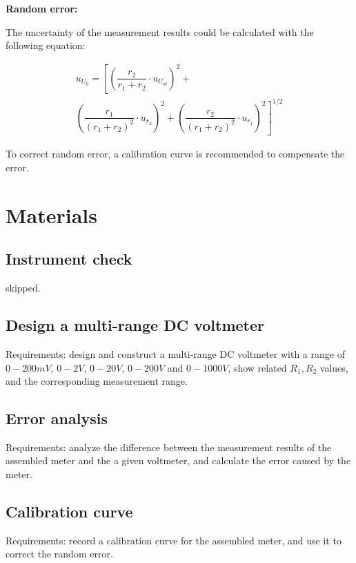 \documentclass[a4paper]{article}
\begin{document}
\begin{multicols*}{2}
    \textbf{Random error:}

    The uncertainty of the measurement results could be calculated with the following equation:

    \begin{equation}
        \begin{split}
            u_{U_0} = \left[\left(\dfrac{r_2}{r_1 + r_2} \cdot u_{U_{i0}}\right)^2 + \right.\\\left.\left(\dfrac{r_1}{(r_1 + r_2)^2} \cdot u_{r_{2}}\right)^2 + \left(\dfrac{r_2}{(r_1 + r_2)^2} \cdot u_{r_{1}}\right)^2 \right]^{1/2}
        \end{split}
    \end{equation}

    To correct random error, a calibration curve is recommended to compensate the error.

    \section*{Materials}

    \subsection*{Instrument check}

    skipped.

    \subsection*{Design a multi-range DC voltmeter}

    Requirements: design and construct a multi-range DC voltmeter with a range of $0-200mV$, $0-2V$, $0-20V$, $0-200V$ and $0-1000V$, show related $R_1, R_2$ values, and the corresponding measurement range.

    \subsection*{Error analysis}

    Requirements: analyze the difference between the measurement results of the assembled meter and the a given voltmeter, and calculate the error caused by the meter.

    \subsection*{Calibration curve}

    Requirements: record a calibration curve for the assembled meter, and use it to correct the random error.


\end{multicols*}
\end{document}
